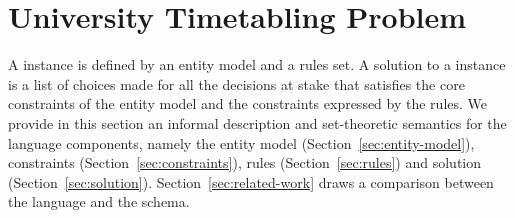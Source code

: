 \section{University Timetabling Problem}
\label{sec:schema}
A \UTP{} instance is defined by an entity model and a rules set. %
%
A solution to a \UTP{} instance is a list of choices made for all the decisions at stake %
that satisfies the core constraints of the entity model and the constraints expressed by the rules.
We provide in this section an informal description and set-theoretic semantics for the \UTP{} language components, namely the entity model (Section~\ref{sec:entity-model}), constraints (Section~\ref{sec:constraints}), rules (Section~\ref{sec:rules}) and solution (Section~\ref{sec:solution}).
Section~\ref{sec:related-work} draws a comparison between the \UTP{} language and the \ITC{} schema.


